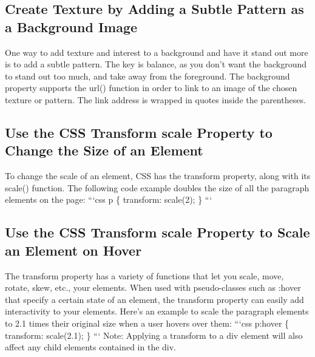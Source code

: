 \documentclass{article}%
\begin{document}
%
\subsection{Create Texture by Adding a Subtle Pattern as a Background Image}%
\label{subsec:CreateTexturebyAddingaSubtlePatternasaBackgroundImage}%
One way to add texture and interest to a background and have it stand out more is to add a subtle pattern. The key is balance, as you don't want the background to stand out too much, and take away from the foreground. The background property supports the url() function in order to link to an image of the chosen texture or pattern. The link address is wrapped in quotes inside the parentheses.\newline%

%
\subsection{Use the CSS Transform scale Property to Change the Size of an Element}%
\label{subsec:UsetheCSSTransformscalePropertytoChangetheSizeofanElement}%
To change the scale of an element, CSS has the transform property, along with its scale() function. The following code example doubles the size of all the paragraph elements on the page:\newline%
```css\newline%
p \{\newline%
  transform: scale(2);\newline%
\}\newline%
```\newline%

%
\subsection{Use the CSS Transform scale Property to Scale an Element on Hover}%
\label{subsec:UsetheCSSTransformscalePropertytoScaleanElementonHover}%
The transform property has a variety of functions that let you scale, move, rotate, skew, etc., your elements. When used with pseudo{-}classes such as :hover that specify a certain state of an element, the transform property can easily add interactivity to your elements.\newline%
Here's an example to scale the paragraph elements to 2.1 times their original size when a user hovers over them:\newline%
```css\newline%
p:hover \{\newline%
  transform: scale(2.1);\newline%
\}\newline%
```\newline%
  Note: Applying a transform to a div element will also affect any child elements contained in the div.\newline%
\end{document}
